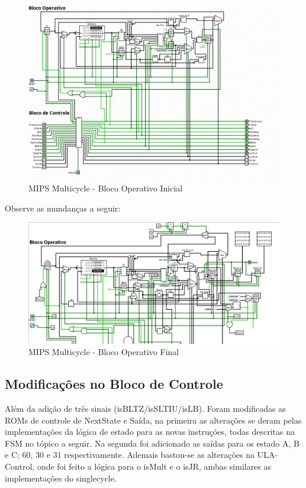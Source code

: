\documentclass{report}
\begin{document}
        \begin{figure}[h!]
            \centering
            \includegraphics[width=\linewidth]{images/prints/Multicycle/Bloco Operativo Multicycle Antes.png}
            \caption{\label{print:Bloco Operativo Inicial} MIPS Multicycle - Bloco Operativo Inicial}
        \end{figure}

        \clearpage
        Observe as mundanças a seguir:
        \begin{figure}[h!]
            \centering
            \includegraphics[width=\linewidth]{images/prints/Multicycle/Bloco Operativo Multicycle Depois.png}
            \caption{\label{print:Bloco Operativo Final} MIPS Multicycle - Bloco Operativo Final}
        \end{figure}



        \clearpage
        \subsection{Modificações no Bloco de Controle}
        Além da adição de três sinais (isBLTZ/isSLTIU/isLB). Foram modificadas as ROMs de controle de NextState e Saída, na primeira as alterações se deram pelas implementações da lógica de estado para as novas instruções, todas descritas na FSM no tópico a seguir.
        Na segunda foi adicionado as saídas para os estado A, B e C; 60, 30 e 31 respectivamente.
        Ademais bastou-se as alterações na ULA-Control, onde foi feito a lógica para o isMult e o isJR, ambas similares as implementações do singlecycle.
\end{document}
